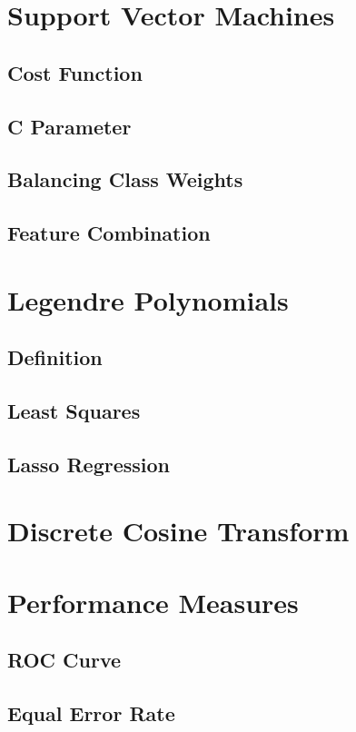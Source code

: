 \documentclass[11pt,a4paper]{tesis}
\begin{document}
	\section{Support Vector Machines}
		
		\subsection{Cost Function}
			
		\subsection{C Parameter}
			
		\subsection{Balancing Class Weights}
			
		\subsection{Feature Combination}
	\section{Legendre Polynomials}
		\subsection{Definition}
		\subsection{Least Squares}
		\subsection{Lasso Regression}
	\section{Discrete Cosine Transform}
	\section{Performance Measures}
		\subsection{ROC Curve}
		\subsection{Equal Error Rate}
			
\end{document}
